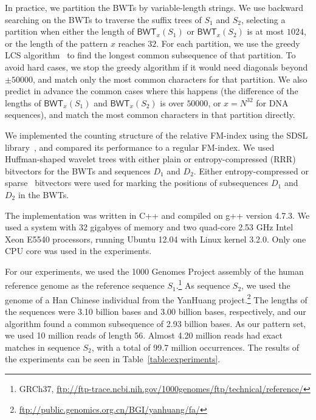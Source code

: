 \documentclass{llncs}
\newcommand{\BWT}
  {\ensuremath{\mathsf{BWT}}}
\begin{document}
In practice, we partition the BWTs by variable-length strings. We use backward searching on the BWTs to traverse the suffix trees of $S_{1}$ and $S_{2}$, selecting a partition when either the length of $\BWT_{x}(S_{1})$ or $\BWT_{x}(S_{2})$ is at most $1024$, or the length of the pattern $x$ reaches $32$. For each partition, we use the greedy LCS algorithm~\cite{Myers86} to find the longest common subsequence of that partition. To avoid hard cases, we stop the greedy algorithm if it would need diagonals beyond $\pm 50000$, and match only the most common characters for that partition. We also predict in advance the common cases where this happens (the difference of the lengths of $\BWT_{x}(S_{1})$ and $\BWT_{x}(S_{2})$ is over $50000$, or $x = N^{32}$ for DNA sequences), and match the most common characters in that partition directly.

We implemented the counting structure of the relative FM-index using the SDSL library~\cite{Gog2014b}, and compared its performance to a regular FM-index. We used Huffman-shaped wavelet trees with either plain or entropy-compressed (RRR)~\cite{Raman2007} bitvectors for the BWTs and sequences $D_{1}$ and $D_{2}$. Either entropy-compressed or sparse~\cite{Okanohara2007} bitvectors were used for marking the positions of subsequences $D_{1}$ and $D_{2}$ in the BWTs.

The implementation was written in C++ and compiled on g++ version 4.7.3. We used a system with 32 gigabyes of memory and two quad-core 2.53 GHz Intel Xeon E5540 processors, running Ubuntu 12.04 with Linux kernel 3.2.0. Only one CPU core was used in the experiments.

For our experiments, we used the 1000 Genomes Project assembly of the human reference genome as the reference sequence $S_{1}$.\footnote{GRCh37, \url{ftp://ftp-trace.ncbi.nih.gov/1000genomes/ftp/technical/reference/}} As sequence $S_{2}$, we used the genome of a Han Chinese individual from the YanHuang project.\footnote{\url{ftp://public.genomics.org.cn/BGI/yanhuang/fa/}} The lengths of the sequences were 3.10 billion bases and 3.00 billion bases, respectively, and our algorithm found a common subsequence of 2.93 billion bases. As our pattern set, we used 10 million reads of length 56. Almost 4.20 million reads had exact matches in sequence $S_{2}$, with a total of 99.7 million occurrences. The results of the experiments can be seen in Table~\ref{table:experiments}.
\end{document}
